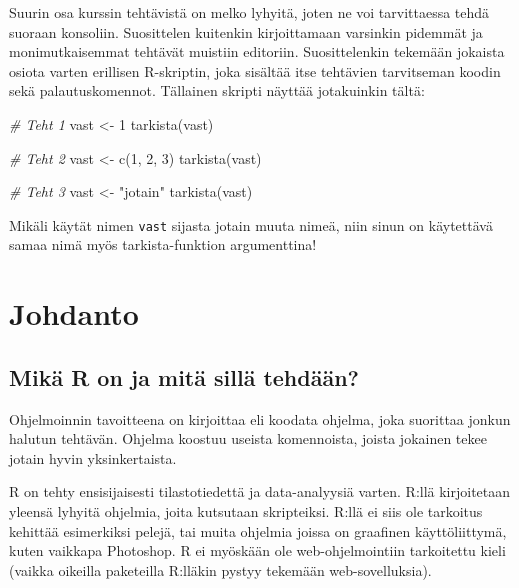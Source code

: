\documentclass[
]{book}
\newenvironment{Shaded}{\begin{snugshade}}{\end{snugshade}}
\newcommand{\CommentTok}[1]{\textcolor[rgb]{0.56,0.35,0.01}{\textit{#1}}}
\newcommand{\DecValTok}[1]{\textcolor[rgb]{0.00,0.00,0.81}{#1}}
\newcommand{\FunctionTok}[1]{\textcolor[rgb]{0.00,0.00,0.00}{#1}}
\newcommand{\NormalTok}[1]{#1}
\newcommand{\OtherTok}[1]{\textcolor[rgb]{0.56,0.35,0.01}{#1}}
\newcommand{\StringTok}[1]{\textcolor[rgb]{0.31,0.60,0.02}{#1}}
\begin{document}
Suurin osa kurssin tehtävistä on melko lyhyitä, joten ne voi tarvittaessa tehdä suoraan konsoliin. Suosittelen kuitenkin kirjoittamaan varsinkin pidemmät ja monimutkaisemmat tehtävät muistiin editoriin. Suosittelenkin tekemään jokaista osiota varten erillisen R-skriptin, joka sisältää itse tehtävien tarvitseman koodin sekä palautuskomennot. Tällainen skripti näyttää jotakuinkin tältä:

\begin{Shaded}
\begin{Highlighting}[]
\CommentTok{\# Teht 1}
\NormalTok{vast }\OtherTok{\textless{}{-}} \DecValTok{1}
\FunctionTok{tarkista}\NormalTok{(vast)}

\CommentTok{\# Teht 2}
\NormalTok{vast }\OtherTok{\textless{}{-}} \FunctionTok{c}\NormalTok{(}\DecValTok{1}\NormalTok{, }\DecValTok{2}\NormalTok{, }\DecValTok{3}\NormalTok{)}
\FunctionTok{tarkista}\NormalTok{(vast)}

\CommentTok{\# Teht 3}
\NormalTok{vast }\OtherTok{\textless{}{-}} \StringTok{"jotain"}
\FunctionTok{tarkista}\NormalTok{(vast)}
\end{Highlighting}
\end{Shaded}

Mikäli käytät nimen \texttt{vast} sijasta jotain muuta nimeä, niin sinun on käytettävä samaa nimä myös tarkista-funktion argumenttina!

\hypertarget{intro}{%
\chapter{Johdanto}\label{intro}}

\hypertarget{what_R}{%
\section{Mikä R on ja mitä sillä tehdään?}\label{what_R}}

Ohjelmoinnin tavoitteena on kirjoittaa eli koodata ohjelma, joka suorittaa jonkun halutun tehtävän. Ohjelma koostuu useista komennoista, joista jokainen tekee jotain hyvin yksinkertaista.

R on tehty ensisijaisesti tilastotiedettä ja data-analyysiä varten. R:llä kirjoitetaan yleensä lyhyitä ohjelmia, joita kutsutaan skripteiksi. R:llä ei siis ole tarkoitus kehittää esimerkiksi pelejä, tai muita ohjelmia joissa on graafinen käyttöliittymä, kuten vaikkapa Photoshop. R ei myöskään ole web-ohjelmointiin tarkoitettu kieli (vaikka oikeilla paketeilla R:lläkin pystyy tekemään web-sovelluksia).
\end{document}
